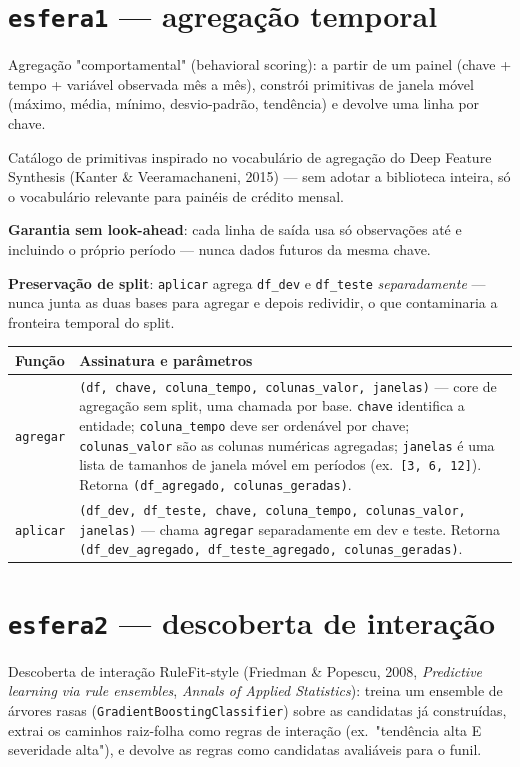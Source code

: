 \documentclass[11pt]{article}
\begin{document}
\section{\texttt{esfera1} --- agregação temporal}

Agregação "comportamental" (behavioral scoring): a partir de um painel
(chave + tempo + variável observada mês a mês), constrói primitivas de
janela móvel (máximo, média, mínimo, desvio-padrão, tendência) e devolve
uma linha por chave.

Catálogo de primitivas inspirado no vocabulário de agregação do Deep
Feature Synthesis (Kanter \& Veeramachaneni, 2015) --- sem
adotar a biblioteca inteira, só o vocabulário relevante para painéis de
crédito mensal.

\textbf{Garantia sem look-ahead}: cada linha de saída usa só observações até
e incluindo o próprio período --- nunca dados futuros da mesma chave.

\textbf{Preservação de split}: \texttt{aplicar} agrega \texttt{df\_dev} e
\texttt{df\_teste} \emph{separadamente} --- nunca junta as duas bases para
agregar e depois redividir, o que contaminaria a fronteira temporal do
split.

\begin{longtable}{P{4cm}P{9.5cm}}
\toprule
\textbf{Função} & \textbf{Assinatura e parâmetros} \\
\midrule
\endhead
\texttt{agregar} &
\texttt{(df, chave, coluna\_tempo, colunas\_valor, janelas)} --- core de
agregação sem split, uma chamada por base. \texttt{chave} identifica a
entidade; \texttt{coluna\_tempo} deve ser ordenável por chave;
\texttt{colunas\_valor} são as colunas numéricas agregadas;
\texttt{janelas} é uma lista de tamanhos de janela móvel em períodos
(ex.\ \texttt{[3, 6, 12]}). Retorna \texttt{(df\_agregado, colunas\_geradas)}. \\[0.4em]
\texttt{aplicar} &
\texttt{(df\_dev, df\_teste, chave, coluna\_tempo, colunas\_valor, janelas)}
--- chama \texttt{agregar} separadamente em dev e teste. Retorna
\texttt{(df\_dev\_agregado, df\_teste\_agregado, colunas\_geradas)}. \\
\bottomrule
\end{longtable}

\section{\texttt{esfera2} --- descoberta de interação}

Descoberta de interação RuleFit-style (Friedman \& Popescu, 2008,
\emph{Predictive learning via rule ensembles},
\emph{Annals of Applied Statistics}): treina um ensemble de árvores rasas
(\texttt{GradientBoostingClassifier}) sobre as candidatas já construídas,
extrai os caminhos raiz-folha como regras de interação (ex.\ "tendência
alta E severidade alta"), e devolve as regras como candidatas avaliáveis
para o funil.
\end{document}
